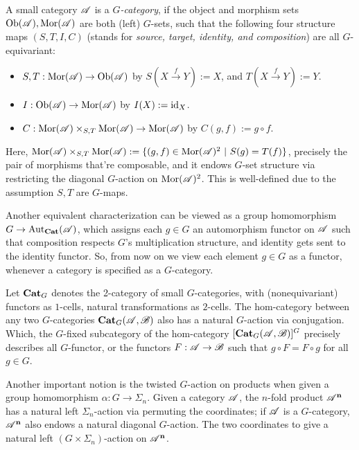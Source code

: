 \documentclass{article}
\begin{document}
\begin{defn}\label{defn_G_cat}
    A small category $\mathscr{A}$ is a \emph{$G$-category}, if the object and morphism sets $\mathrm{Ob}(\mathscr{A}), \mathrm{Mor}(\mathscr{A})$ are both (left) $G$-sets, such that the following four structure maps $(S,T,I,C)$ (stands for \emph{source, target, identity, and composition}) are all $G$-equivariant:
    \begin{itemize}
        \item $S,T:\mathrm{Mor}(\mathscr{A})\rightarrow\mathrm{Ob}(\mathscr{A})$ by $S(X\xrightarrow{f}Y):= X$, and $T(X\xrightarrow{f}Y):= Y$.
        \item $I:\mathrm{Ob}(\mathscr{A})\rightarrow\mathrm{Mor}(\mathscr{A})$ by $I(X):= \mathrm{id}_X$.
        \item $C:\mathrm{Mor}(\mathscr{A})\times_{S,T}\mathrm{Mor}(\mathscr{A})\rightarrow\mathrm{Mor}(\mathscr{A})$ by $C(g,f):= g\circ f$.
    \end{itemize}
    Here, $\mathrm{Mor}(\mathscr{A})\times_{S,T}\mathrm{Mor}(\mathscr{A}):= \{(g,f)\in \mathrm{Mor}(\mathscr{A})^2\ |\ S(g)=T(f)\}$, precisely the pair of morphisms that're composable, and it endows $G$-set structure via restricting the diagonal $G$-action on $\mathrm{Mor}(\mathscr{A})^2$. This is well-defined due to the assumption $S,T$ are $G$-maps.
\end{defn}

Another equivalent characterization can be viewed as a group homomorphism $G\rightarrow\mathrm{Aut}_{\mathbf{Cat}}(\mathscr{A})$, which assigns each $g\in G$ an automorphism functor on $\mathscr{A}$ such that composition respects $G$'s multiplication structure, and identity gets sent to the identity functor. So, from now on we view each element $g\in G$ as a functor, whenever a category is specified as a $G$-category.

\hfil

\begin{defn}\label{defn_cat_of_G_cat}
Let $\mathbf{Cat}_G$ denotes the 2-category of small $G$-categories, with (nonequivariant) functors as $1$-cells, natural transformations as $2$-cells. The hom-category between any two $G$-categories $\mathbf{Cat}_G(\mathscr{A},\mathscr{B})$ also has a natural $G$-action via conjugation.  Which, the $G$-fixed subcategory of the hom-category $[\mathbf{Cat}_G(\mathscr{A},\mathscr{B})]^G$ precisely describes all $G$-functor, or the functors $F:\mathscr{A}\rightarrow\mathscr{B}$ such that $g\circ F=F\circ g$ for all $g\in G$.
\end{defn}

\hfil

Another important notion is the twisted $G$-action on products when given a group homomorphism $\alpha:G\rightarrow\Sigma_n$. Given a category $\mathscr{A}$, the $n$-fold product $\mathscr{A}^\mathbf{n}$ has a natural left $\Sigma_n$-action via permuting the coordinates; if $\mathscr{A}$ is a $G$-category, $\mathscr{A}^\mathbf{n}$ also endows a natural diagonal $G$-action. The two coordinates to give a natural left $(G\times \Sigma_n)$-action on $\mathscr{A}^\mathbf{n}$.
\end{document}
